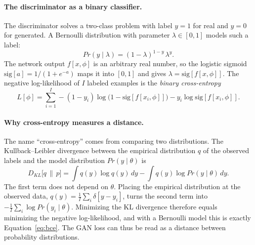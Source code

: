 \paragraph{The discriminator as a binary classifier.}
The discriminator solves a two-class problem with label $y=1$ for real and
$y=0$ for generated. A Bernoulli distribution with parameter
$\lambda\in[0,1]$ models such a label:
\begin{equation}
  Pr(y\mid\lambda) = (1-\lambda)^{1-y}\,\lambda^{y}.
  \label{eq:bernoulli}
\end{equation}
\noindent
The network output $f[x,\phi]$ is an arbitrary real number, so the logistic
sigmoid $\mathrm{sig}[a]=1/(1+e^{-a})$ maps it into $[0,1]$ and gives
$\lambda=\mathrm{sig}[f[x,\phi]]$. The negative log-likelihood of $I$ labeled
examples is the \emph{binary cross-entropy}
\begin{equation}
  L[\phi] = \sum_{i=1}^{I}
    -(1-y_i)\log\bigl(1-\mathrm{sig}[f[x_i,\phi]]\bigr)
    - y_i\log\mathrm{sig}[f[x_i,\phi]].
  \label{eq:bce}
\end{equation}

\paragraph{Why cross-entropy measures a distance.}
The name ``cross-entropy'' comes from comparing two distributions. The
Kullback--Leibler divergence between the empirical distribution $q$ of the
observed labels and the model distribution $Pr(y\mid\theta)$ is
\begin{equation}
  D_{KL}\bigl[q\,\|\,p\bigr] = \int q(y)\log q(y)\,dy
    - \int q(y)\log Pr(y\mid\theta)\,dy .
  \label{eq:kl}
\end{equation}
\noindent
The first term does not depend on $\theta$. Placing the empirical distribution
at the observed data, $q(y)=\frac1I\sum_i\delta[y-y_i]$, turns the second
term into $-\frac1I\sum_i\log Pr(y_i\mid\theta)$. Minimizing the KL divergence
therefore equals minimizing the negative log-likelihood, and with a Bernoulli
model this is exactly Equation~\ref{eq:bce}. The GAN loss can thus be read as a
distance between probability distributions.

